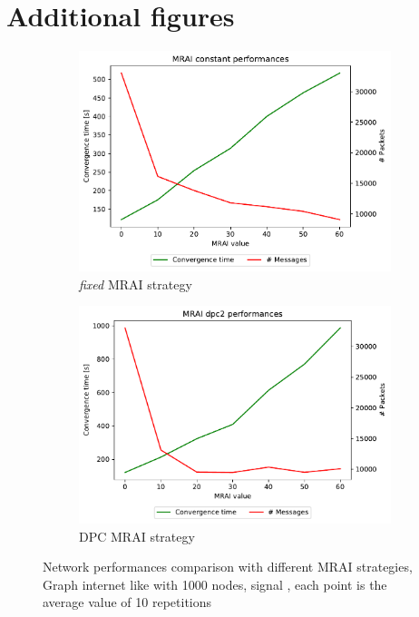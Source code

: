 \chapter{Additional figures}
\label{cha:appendx}

\begin{figure}[h]
     \centering
     \begin{subfigure}[b]{0.49\textwidth}
         \centering
         \includegraphics[width=\textwidth]{images/internet_like/1000/signals/AWAW/constant/internet_like-constant_AWAW_mrai_evolution.pdf}
		 \caption{\textit{fixed} \ac{MRAI} strategy}
         \label{fig:internet_like_1000_fixed_AWAW}
     \end{subfigure}
     \hfill
     \begin{subfigure}[b]{0.49\textwidth}
         \centering
         \includegraphics[width=\textwidth]{images/internet_like/1000/signals/AWAW/dpc/internet_like-DPC_AWAW_mrai_evolution.pdf}
		 \caption{\ac{DPC} \ac{MRAI} strategy}
         \label{fig:internet_like_1000_dpc_AWAW}
     \end{subfigure}
	 \caption{Network performances comparison with different \ac{MRAI} strategies,
		Graph internet like with \num{1000} nodes, signal , each point is
		the average value of \num{10} repetitions
		}
        \label{fig:internt_like_1000_evolution_AWAW}
\end{figure}

